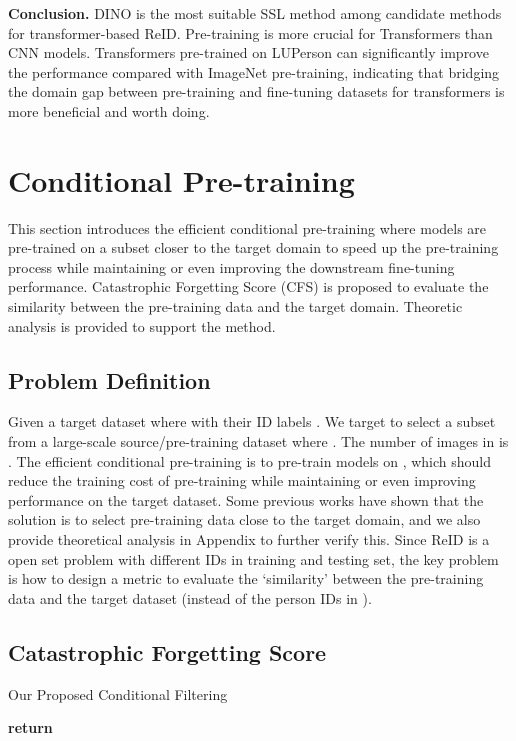 \documentclass[10pt,twocolumn,letterpaper]{article}
\begin{document}
\noindent\textbf{Conclusion.} DINO is the most suitable SSL method among candidate methods for transformer-based ReID. Pre-training is more crucial for Transformers than CNN models.  Transformers pre-trained on LUPerson can significantly improve the performance compared with ImageNet pre-training, indicating that bridging the domain gap between pre-training and fine-tuning datasets for transformers is more beneficial and worth doing. 

\section{Conditional Pre-training}
This section introduces the efficient conditional pre-training where models are pre-trained on a subset closer to the target domain to speed up the pre-training process while maintaining or even improving the downstream fine-tuning performance. Catastrophic Forgetting Score (CFS) is proposed to evaluate the similarity between the pre-training data and the target domain. Theoretic analysis is provided to support the method. 

\subsection{Problem Definition}

Given a target dataset  where  with their ID labels . We target to select a subset  from a large-scale source/pre-training dataset  where . 
The number of images in  is . The efficient conditional pre-training is to pre-train models on , which should reduce the training cost of pre-training while maintaining or even improving performance on the target dataset. Some previous works \cite{chakraborty2020efficient, coleman2020selection, Fine} have shown that the solution is to select pre-training data close to the target domain, and we also provide theoretical analysis in Appendix to further verify this. Since ReID is a open set problem with different IDs in training and testing set, the key problem is how to design a metric to evaluate the `similarity' between the pre-training data  and the target dataset  (instead of the person IDs in ).

\subsection{Catastrophic Forgetting Score}

\vspace{-1em}
\begin{algorithm}[!ht]
\caption{Our Proposed Conditional Filtering}\label{alg:clustering}
\begin{algorithmic}[1]
\State  {}
\State  {}
 \Comment{}
\State  {}
\EndFor
\State  {}
\State  {}
\State \textbf{return} 
\EndProcedure
\end{algorithmic}
\end{algorithm}
\end{document}
